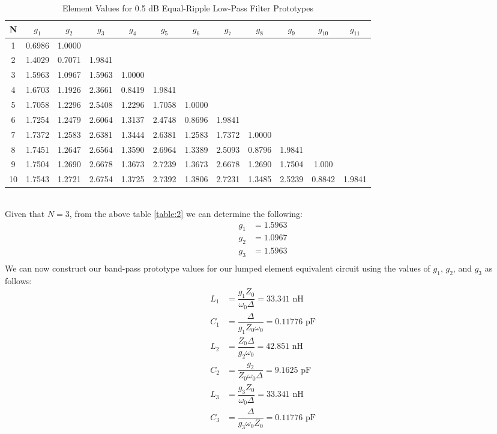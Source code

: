 \documentclass{article}
\begin{document}
\begin{table}[h!]
\centering
\begin{tabular}{| c | c | c | c | c | c | c | c | c | c | c | c |} 
 \hline
 N & $g_1$ & $g_2$ & $g_3$ & $g_4$ & $g_5$ & $g_6$ & $g_7$ & $g_8$ & $g_9$ & $g_{10}$ & $g_{11}$ \\ [0.5ex] 
 \hline
 1 & 0.6986 & 1.0000 & & & & & & & & & \\ 
 \hline
 2 & 1.4029 & 0.7071 & 1.9841 & & & & & & & & \\
 \hline
 3 & 1.5963 & 1.0967 & 1.5963 & 1.0000 & & & & & & & \\
 \hline
 4 & 1.6703 & 1.1926 & 2.3661 & 0.8419 & 1.9841 & & & & & & \\
 \hline
 5 & 1.7058 & 1.2296 & 2.5408 & 1.2296 & 1.7058 & 1.0000 & & & & & \\
 \hline
 6 & 1.7254 & 1.2479 & 2.6064 & 1.3137 & 2.4748 & 0.8696 & 1.9841 & & & & \\
 \hline
 7 & 1.7372 & 1.2583 & 2.6381 & 1.3444 & 2.6381 & 1.2583 & 1.7372 & 1.0000 & & & \\
 \hline
 8 & 1.7451 & 1.2647 & 2.6564 & 1.3590 & 2.6964 & 1.3389 & 2.5093 & 0.8796 & 1.9841 & & \\
 \hline
 9 & 1.7504 & 1.2690 & 2.6678 & 1.3673 & 2.7239 & 1.3673 & 2.6678 & 1.2690 & 1.7504 & 1.000 & \\
 \hline
 10 & 1.7543 & 1.2721 & 2.6754 & 1.3725 & 2.7392 & 1.3806 & 2.7231 & 1.3485 & 2.5239 & 0.8842 & 1.9841 \\
 \hline
\end{tabular}
\caption{Element Values for 0.5 dB Equal-Ripple Low-Pass Filter Prototypes}
\label{table:3}
\end{table}
\text{ }\\
Given that $N=3$, from the above table \ref{table:2} we can determine the following:
\begin{align*}
    g_1 &= 1.5963 \\
    g_2 &= 1.0967 \\
    g_3 &= 1.5963 \\
\end{align*}
We can now construct our band-pass prototype values for our lumped element equivalent circuit using the values of $g_1$, $g_2$, and $g_3$ as follows:
\begin{align}
    L_1 &= \dfrac{g_1 Z_0}{\omega_0 \Delta} = 33.341 \text{ nH} \\
    C_1 &= \dfrac{\Delta}{g_1 Z_0 \omega_0} = 0.11776 \text{ pF} \\
    L_2 &= \dfrac{Z_0 \Delta}{g_2 \omega_0} = 42.851 \text{ nH} \\
    C_2 &= \dfrac{g_2}{Z_0 \omega_0 \Delta} = 9.1625 \text{ pF} \\
    L_3 &= \dfrac{g_3 Z_0}{\omega_0 \Delta} = 33.341 \text{ nH} \\
    C_3 &= \dfrac{\Delta}{g_3 \omega_0 Z_0} = 0.11776 \text{ pF}
\end{align}
\end{document}
